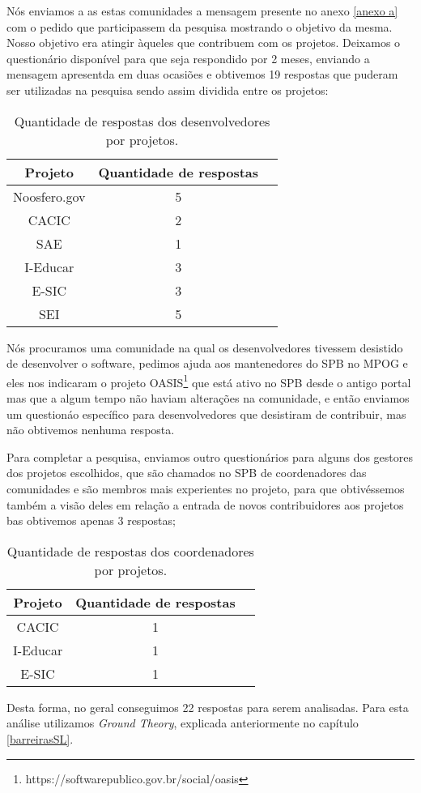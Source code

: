 Nós enviamos a as estas comunidades a mensagem presente no anexo \ref{anexo a}
com o pedido que participassem da pesquisa mostrando o objetivo da mesma. Nosso objetivo 
era atingir àqueles que contribuem com os projetos. Deixamos o questionário disponível 
para que seja respondido por 2 meses, enviando a mensagem apresentda em duas ocasiões e obtivemos
19 respostas que puderam ser utilizadas na pesquisa sendo assim dividida entre os projetos:


\begin{table}[h]
	\centering
	\label{tab01}
	
	\begin{tabular}{ccc}
		\toprule
		\textbf{Projeto} & \textbf{Quantidade de respostas} \\
		\midrule
		Noosfero.gov & 5 \\
		CACIC & 2 \\
		SAE & 1 \\
		I-Educar & 3 \\
		E-SIC & 3 \\
		SEI & 5 \\
		\bottomrule
	\end{tabular}

	\caption{Quantidade de respostas dos desenvolvedores por projetos.}
\end{table}
  
Nós procuramos uma comunidade na qual os desenvolvedores tivessem desistido
de desenvolver o software, pedimos ajuda aos mantenedores do SPB no MPOG e eles nos 
indicaram o projeto OASIS\footnote{https://softwarepublico.gov.br/social/oasis} que 
está ativo no SPB desde o antigo portal mas que a algum tempo não haviam alterações
na comunidade, e então enviamos um questionáo específico para desenvolvedores
que desistiram de contribuir, mas não obtivemos nenhuma resposta. 

Para completar a pesquisa, enviamos outro questionários para alguns dos gestores dos
projetos escolhidos, que são chamados no SPB de coordenadores das comunidades e 
são membros mais experientes no projeto, para que obtivéssemos também a visão 
deles em relação a entrada de novos contribuidores aos projetos bas obtivemos 
apenas 3 respostas;

\begin{table}[h]
	\centering
	\label{tab01}
	
	\begin{tabular}{ccc}
		\toprule
		\textbf{Projeto} & \textbf{Quantidade de respostas} \\
		\midrule
		CACIC & 1 \\
		I-Educar & 1 \\
		E-SIC & 1 \\
		\bottomrule
	\end{tabular}

	\caption{Quantidade de respostas dos coordenadores por projetos.}
\end{table}

Desta forma, no geral conseguimos 22 respostas para serem analisadas. Para esta
análise utilizamos \textit{Ground Theory}, explicada anteriormente no capítulo
\ref{barreirasSL}.


